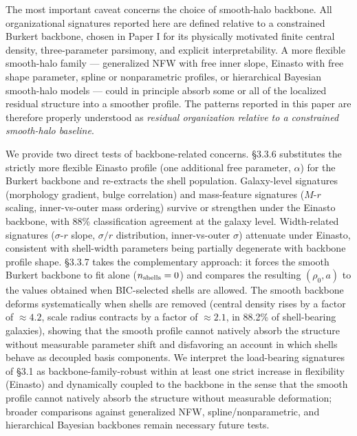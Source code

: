 \documentclass[linenumbers,trackchanges]{aastex701}
\begin{document}
The most important caveat concerns the choice of smooth-halo backbone. All organizational signatures reported here are defined relative to a constrained Burkert backbone, chosen in Paper I for its physically motivated finite central density, three-parameter parsimony, and explicit interpretability. A more flexible smooth-halo family --- generalized NFW with free inner slope, Einasto with free shape parameter, spline or nonparametric profiles, or hierarchical Bayesian smooth-halo models --- could in principle absorb some or all of the localized residual structure into a smoother profile. The patterns reported in this paper are therefore properly understood as \emph{residual organization relative to a constrained smooth-halo baseline}.

We provide two direct tests of backbone-related concerns. \S3.3.6 substitutes the strictly more flexible Einasto profile (one additional free parameter, $\alpha$) for the Burkert backbone and re-extracts the shell population. Galaxy-level signatures (morphology gradient, bulge correlation) and mass-feature signatures ($M$-$r$ scaling, inner-vs-outer mass ordering) survive or strengthen under the Einasto backbone, with 88\% classification agreement at the galaxy level. Width-related signatures ($\sigma$-$r$ slope, $\sigma/r$ distribution, inner-vs-outer $\sigma$) attenuate under Einasto, consistent with shell-width parameters being partially degenerate with backbone profile shape. \S3.3.7 takes the complementary approach: it forces the smooth Burkert backbone to fit alone ($n_{\rm shells} = 0$) and compares the resulting $(\rho_0, a)$ to the values obtained when BIC-selected shells are allowed. The smooth backbone deforms systematically when shells are removed (central density rises by a factor of $\approx 4.2$, scale radius contracts by a factor of $\approx 2.1$, in 88.2\% of shell-bearing galaxies), showing that the smooth profile cannot natively absorb the structure without measurable parameter shift and disfavoring an account in which shells behave as decoupled basis components. We interpret the load-bearing signatures of \S3.1 as backbone-family-robust within at least one strict increase in flexibility (Einasto) and dynamically coupled to the backbone in the sense that the smooth profile cannot natively absorb the structure without measurable deformation; broader comparisons against generalized NFW, spline/nonparametric, and hierarchical Bayesian backbones remain necessary future tests.
\end{document}
